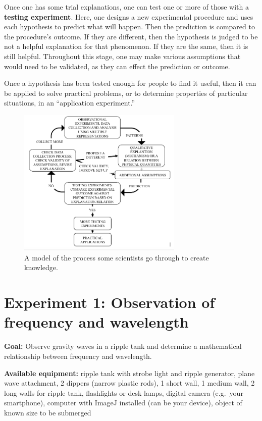 Once one has some trial explanations, one can test one or more of those with a \textbf{testing experiment}. Here, one designs a new experimental procedure and uses each hypothesis to predict what will happen. Then the prediction is compared to the procedure's outcome. If they are different, then the hypothesis is judged to be not a helpful explanation for that phenomenon. If they are the same, then it is still helpful. Throughout this stage, one may make various assumptions that would need to be validated, as they can effect the prediction or outcome.

Once a hypothesis has been tested enough for people to find it useful, then it can be applied to solve practical problems, or to determine properties of particular situations, in an ``application experiment.''

\begin{figure}
	\centering
	\includegraphics[width=0.7\textwidth]{ripple-tank/islegraphic.png}
	\caption{A model of the process some scientists go through to create knowledge.\cite{etkina_millikan_2015}}\label{me:fig:isle}
\end{figure}

\section{Experiment 1: Observation of frequency and wavelength}

\textbf{Goal:} Observe gravity waves in a ripple tank and determine a mathematical relationship between frequency and wavelength.

\textbf{Available equipment:} ripple tank with strobe light and ripple generator, plane wave attachment, 2 dippers (narrow plastic rods), 1 short wall, 1 medium wall, 2 long walls for ripple tank, flashlights or desk lamps, digital camera (e.g.\ your smartphone), computer with ImageJ installed (can be your device), object of known size to be submerged

